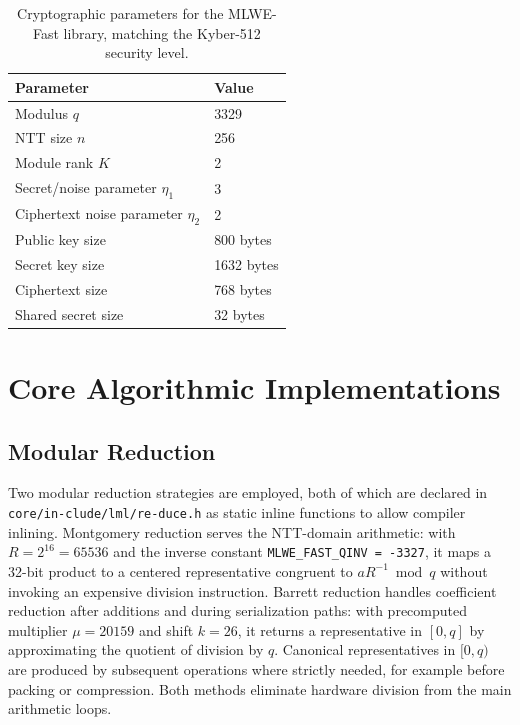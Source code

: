 \begin{table}[htbp]
    \centering
    \caption{Cryptographic parameters for the MLWE-Fast library, matching the Kyber-512 security level. }
    \label{tab:crypto_params}
    \begin{tabular}{ll}
        \toprule
        Parameter & Value \\
        \midrule
        Modulus $q$ & 3329 \\
        NTT size $n$ & 256 \\
        Module rank $K$ & 2 \\
        Secret/noise parameter $\eta_1$ & 3 \\
        Ciphertext noise parameter $\eta_2$ & 2 \\
        Public key size & 800 bytes \\
        Secret key size & 1632 bytes \\
        Ciphertext size & 768 bytes \\
        Shared secret size & 32 bytes \\
        \bottomrule
    \end{tabular}
\end{table}

\section{Core Algorithmic Implementations}
\label{sec:core_algorithms}

\subsection{Modular Reduction}
\label{sub:modular_reduction}

Two modular reduction strategies are employed, both of which are declared in \texttt{core/}\allowbreak\texttt{in-clude/}\allowbreak\texttt{lml/}\allowbreak\texttt{re-duce.h} as static inline functions to allow compiler inlining. Montgomery reduction serves the NTT-domain arithmetic: with $R = 2^{16} = 65536$ and the inverse constant \texttt{MLWE\_FAST\_QINV = -3327}, it maps a 32-bit product to a centered representative congruent to $aR^{-1} \bmod q$ without invoking an expensive division instruction. Barrett reduction handles coefficient reduction after additions and during serialization paths: with precomputed multiplier $\mu = 20159$ and shift $k = 26$, it returns a representative in $[0,q]$ by approximating the quotient of division by $q$. Canonical representatives in $[0,q)$ are produced by subsequent operations where strictly needed, for example before packing or compression. Both methods eliminate hardware division from the main arithmetic loops.


